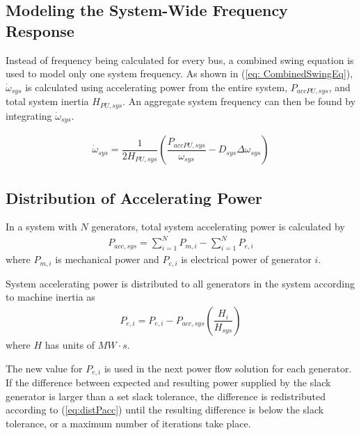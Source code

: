 \subsection{Modeling the System-Wide Frequency Response}
Instead of frequency being calculated for every bus, a combined swing equation is used to model only one system frequency.
As shown in (\ref{eq: CombinedSwingEq}), $\dot{\omega}_{sys}$ is calculated using accelerating power from the entire system, $P_{acc PU, sys}$, and total system inertia $H_{PU, sys}$.
An aggregate system frequency can then be found by integrating $\dot{\omega}_{sys}$.

\begin{align}
\dot{\omega}_{sys} = \dfrac{1}{2H_{PU, sys} } \left( \dfrac{P_{acc PU, sys} }{\omega_{sys}} - D_{sys}\Delta\omega_{sys}  \right) \label{eq: CombinedSwingEq}
\end{align} 

\subsection{Distribution of Accelerating Power}
In a system with $N$ generators, total system accelerating power is calculated by
\begin{align}
P_{acc, sys} = \sum_{i=1}^{N} P_{m,i}  - \sum_{i=1}^{N} P_{e,i} \label{eq:Pacc} 
\end{align}
\noindent where $P_{m,i}$ is mechanical power and $P_{e,i}$ is electrical power of generator $i$.

System accelerating power is distributed to all generators in the system according to machine inertia as
\begin{align}
P_{e, i} = P_{e, i}  - P_{acc, sys}\left( \dfrac{H_i}{H_{sys}}\right) \label{eq:distPacc}
\end{align}
where $H$ has units of $MW\cdot s$.

The new value for $P_{e, i}$ is used in the next power flow solution for each generator.
If the difference between expected and resulting power supplied by the slack generator is larger than a set slack tolerance, the difference is redistributed according to (\ref{eq:distPacc}) until the resulting difference is below the slack tolerance, or a maximum number of iterations take place\cite{Stajcar}.
